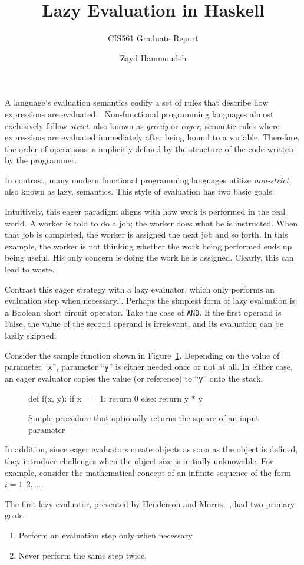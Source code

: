 \documentclass[11pt]{report}
\title{Lazy Evaluation in Haskell}
\subtitle{CIS561 Graduate Report}
\author{Zayd Hammoudeh}
\begin{document}
A language's evaluation semantics codify a set of rules that describe how expressions are evaluated.~\cite{hoover:Notes}  Non-functional programming languages almost exclusively follow \textit{strict}, also known as \textit{greedy} or \textit{eager}, semantic rules where expressions are evaluated immediately after being bound to a variable.  Therefore, the order of operations is implicitly defined by the structure of the code written by the programmer.

In contrast, many modern functional programming languages utilize \textit{non-strict}, also known as lazy, semantics.  This style of evaluation has two basic goals:



    Intuitively, this eager paradigm aligns with how work is performed in the real world.  A worker is told to do a job; the worker does what he is instructed. When that job is completed, the worker is assigned the next job and so forth. In this example, the worker is not thinking whether the work being performed ends up being useful.  His only concern is doing the work he is assigned.  Clearly, this can lead to waste.

    Contrast this eager strategy with a lazy evaluator, which only performs an evaluation step when necessary.!\cite{Henderson:1976}. Perhaps the simplest form of lazy evaluation is a Boolean short circuit operator.  Take the case of {\tt AND}.  If the first operand is False, the value of the second operand is irrelevant, and its evaluation can be lazily skipped.

    Consider the sample function shown in Figure~\ref{lst:Square}.  Depending on the value of parameter ``{\tt x}'', parameter ``{\tt y}'' is either needed once or not at all.  In either case, an eager evaluator copies the value (or reference) to ``{\tt y}'' onto the stack.

    \begin{figure}
        \begin{listings}[python]
            def f(x, y):
            if x == 1:
            return 0
            else:
            return y * y
        \end{listings}
        \caption{Simple procedure that optionally returns the square of an input parameter}\label{lst:Square}
    \end{figure}

    In addition, since eager evaluators create objects as soon as the object is defined, they introduce challenges when the object size is initially unknowable.  For example, consider the mathematical concept of an infinite sequence of the form $i = 1, 2,\ldots$.

    The first lazy evaluator, presented by Henderson and Morris,~\cite{Henderson:1976}, had two primary goals:
    \begin{enumerate}
        \item Perform an evaluation step only when necessary
        \item Never perform the same step twice.
    \end{enumerate}
\noindent
\end{document}
